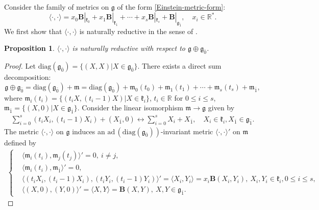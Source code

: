 \documentclass[reqno]{amsart}
\newtheorem{prop}[thm]{Proposition}
\theoremstyle{definition}
\begin{document}
Consider the  family of metrics on  $\mathfrak{g}$ of the form \eqref{Einstein-metric-form}:
\begin{equation*}
\langle\cdot,\cdot\rangle
 =x_{0}\mathbf{B}|_{\mathfrak{k}_{0}}+x_{1}\mathbf{B}|_{\mathfrak{k}_{1}}+\cdots+x_{s}\mathbf{B}|_{\mathfrak{k}_{s}}
 +\mathbf{B}|_{\mathfrak{g}_{\bar{1}}}, \quad x_{i}\in \mathbb{R}^{\ast}.
\end{equation*}
 We first show that $\langle\cdot,\cdot\rangle$ is naturally reductive
 in the sense of \cite[Section 3.5]{ZGPR24}.
 \begin{prop}
 $\langle\cdot,\cdot\rangle$ is naturally reductive with respect to $\mathfrak{g}\oplus\mathfrak{g}_{\bar{0}}$.
 \end{prop}
 \begin{proof}
Let $\mathrm{diag}(\mathfrak{g}_{\bar{0}})=\{(X,X)|X\in\mathfrak{g}_{\bar{0}}\}$.
There exists a direct sum decomposition:
$$\mathfrak{g}\oplus\mathfrak{g}_{\bar{0}}
=\mathrm{diag}(\mathfrak{g}_{\bar{0}})+\mathfrak{m}
=\mathrm{diag}(\mathfrak{g}_{\bar{0}})
+\mathfrak{m}_{0}(t_{0})+\mathfrak{m}_{1}(t_{1})+\cdots+\mathfrak{m}_{s}(t_{s})+\mathfrak{m}_{\bar{1}},$$
where
$\mathfrak{m}_{i}(t_{i})=\{(t_{i}X,(t_{i}-1)X)|X\in\mathfrak{k}_{i}\}$,
 $t_{i}\in \mathbb{R}$ for $0\leq i\leq s$,
 $\mathfrak{m}_{\bar{1}}=\{(X,0)|X\in\mathfrak{g}_{\bar{1}}\}$.
Consider the linear isomorphism  $\mathfrak{m}\rightarrow\mathfrak{g}$ given by
\begin{eqnarray*}
\sum_{i=0}^{s}(t_{i}X_{i},(t_{i}-1)X_{i})+(X_{\bar{1}},0)\longleftrightarrow \sum_{i=0}^{s}X_{i}+X_{\bar{1}}, \quad X_{i}\in\mathfrak{k}_{i}, X_{\bar{1}}\in\mathfrak{g}_{\bar{1}}.
\end{eqnarray*}
The metric $\langle\cdot,\cdot\rangle$ on $\mathfrak{g}$ induces  an $\mathrm{ad}\,(\mathrm{diag}(\mathfrak{g}_{\bar{0}}))$-invariant metric $\langle\cdot,\cdot\rangle'$ on $\mathfrak{m}$ defined by
\begin{eqnarray*}
\left\{
\begin{aligned}
& \langle \mathfrak{m}_{i}(t_{i}),\mathfrak{m}_{j}(t_{j}) \rangle'=0, \  i\neq j,\\
& \langle \mathfrak{m}_{i}(t_{i}),\mathfrak{m}_{\bar{1}} \rangle'=0,\\
& \langle (t_{i}X_{i},(t_{i}-1)X_{i}), (t_{i}Y_{i},(t_{i}-1)Y_{i})\rangle'=\langle X_{i},Y_{i}\rangle=x_{i}\mathbf{B}(X_{i},Y_{i}),
                                                                               \ X_{i},Y_{i}\in\mathfrak{k}_{i}, 0\leq i\leq s,\\
& \langle (X,0),(Y,0)\rangle'=\langle X,Y\rangle=\mathbf{B}(X,Y), \ X,Y\in\mathfrak{g}_{\bar{1}}.
\end{aligned}\right.
\end{eqnarray*}


\end{proof}
\end{document}
